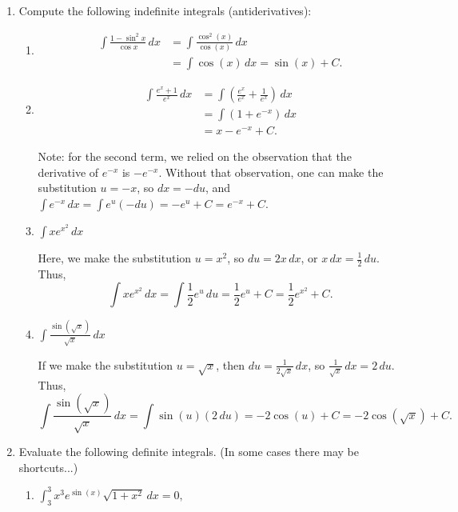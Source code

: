 \documentclass[12pt]{article}
\newcommand{\di}{\displaystyle}
\begin{document}
\thispagestyle{fancy}

\begin{enumerate}
 \item Compute the following indefinite integrals (antiderivatives):

\begin{enumerate}
 \item \begin{align*}
        \int \frac{1-\sin^2x}{\cos x}\,dx & = \int\frac{\cos^2(x)}{\cos(x)}\,dx\\
					  & = \int \cos(x)\,dx = \sin(x)+C.
       \end{align*}


\bigskip

 \item \begin{align*}
        \int \frac{e^x+1}{e^x}\, dx & = \int\left(\frac{e^x}{e^x}+\frac{1}{e^x}\right)\,dx\\
				    & = \int(1+e^{-x})\,dx\\
				    & = x-e^{-x}+C.
       \end{align*}

Note: for the second term, we relied on the observation that the derivative of $e^{-x}$ is $-e^{-x}$. Without that observation, one can make the substitution $u=-x$, so $dx = -du$, and $\int e^{-x}\,dx = \int e^u(-du) = -e^u+C = e^{-x}+C$.

\bigskip

 \item $\di \int xe^{x^2}\,dx$

\bigskip

Here, we make the substitution $u=x^2$, so $du=2x\,dx$, or $x\,dx = \frac{1}{2}\,du$. Thus,
\[
 \int xe^{x^2}\,dx = \int \frac{1}{2}e^u\,du = \frac{1}{2}e^u+C = \frac{1}{2}e^{x^2}+C.
\]

\bigskip

 \item $\di \int \frac{\sin(\sqrt{x})}{\sqrt{x}}\,dx$

\bigskip

If we make the substitution $u=\sqrt{x}$, then $du = \frac{1}{2\sqrt{x}}\,dx$, so $\frac{1}{\sqrt{x}}\,dx = 2\,du$. Thus,
\[
 \int\frac{\sin(\sqrt{x})}{\sqrt{x}}\,dx = \int \sin(u) (2\,du) = -2\cos(u)+C = -2\cos(\sqrt{x})+C.
\]

\end{enumerate}
\newpage

 \item Evaluate the following definite integrals. (In some cases there may be shortcuts...)
\begin{enumerate}
 \item $\di \int_3^3 x^3e^{\sin(x)}\sqrt{1+x^2}\,dx = 0,$


\end{enumerate}
\end{enumerate}
\end{document}
